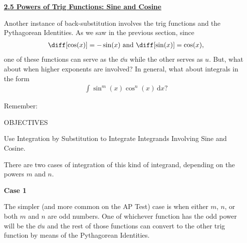 \textbf{\underline{\large{2.5 Powers of Trig Functions: Sine and Cosine}}} \par

Another instance of back-substitution involves the trig functions and the Pythagorean Identities. As we saw in the previous section, since \begin{align*}
    \diff [\cos (x)] = -\sin (x) \text{ and } \diff [\sin (x)] = \cos (x),
\end{align*}
one of these functions can serve as the $\dd u$ while the other serves as $u$. But, what about when higher exponents are involved? In general, what about integrals in the form \begin{align*}
    \int \sin^m (x)\cos^n (x) \,\mathrm{d}x?
\end{align*}

Remember: \par


\begin{tcolorbox}[objective]
    \begin{center}
        OBJECTIVES \\[11pt]
    \end{center}
    Use Integration by Substitution to Integrate Integrands Involving Sine and Cosine.
\end{tcolorbox}

There are two cases of integration of this kind of integrand, depending on the powers $m$ and $n$. \par

\textbf{Case 1} \par

The simpler (and more common on the AP Test) case is when either $m$, $n$, or both $m$ and $n$ are odd numbers. One of whichever function has the odd power will be the $\dd u$ and the rest of those functions can convert to the other trig function by means of the Pythagorean Identities. \par

